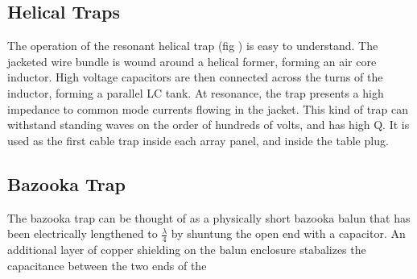 \subsection{Helical Traps}
The operation of the resonant helical trap (fig \cite{helical_trap}) is easy to understand.  The jacketed wire bundle is
wound around a helical former, forming an air core inductor. High voltage capacitors are then connected across the turns
of the inductor, forming a parallel LC tank. At resonance, the trap presents a high impedance to common mode currents flowing in the jacket. 
This kind of trap can withstand standing waves on the order of hundreds of volts, and has high Q. It is used as the first cable trap inside each array panel, and inside the table plug.

\subsection{Bazooka Trap}
The bazooka trap can be thought of as a physically short bazooka balun that has been electrically lengthened to $\frac{\lambda}{4}$ by shuntung the open end with a capacitor. An additional layer of copper shielding on the balun enclosure stabalizes the capacitance between the two ends of the 
